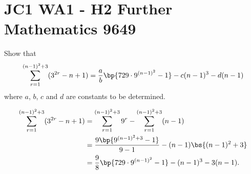 \section{JC1 WA1 - H2 Further Mathematics 9649}

\begin{problem}
    Show that \[\sum_{r=1}^{(n-1)^2 + 3} (3^{2r} - n + 1) = \frac{a}{b} \bp{729 \cdot 9^{(n-1)^2} - 1} - c(n-1)^3 - d(n-1)\] where $a$, $b$, $c$ and $d$ are constants to be determined.
\end{problem}
\begin{solution}
    \begin{align*}
        \sum_{r=1}^{(n-1)^2 + 3} (3^{2r} - n + 1) &= \sum_{r=1}^{(n-1)^2 + 3} 9^r  - \sum_{r=1}^{(n-1)^2 + 3}(n - 1)\\
        &= \frac{9\bp{9^{(n-1)^2 + 3} - 1}}{9-1} - (n-1)\bs{(n-1)^2 + 3}\\
        &= \frac98 \bp{729 \cdot 9^{(n-1)^2} - 1} - (n-1)^3 - 3(n-1).
    \end{align*}
\end{solution}

